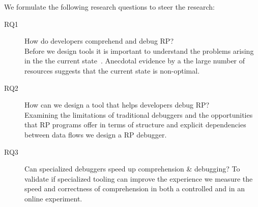 
We formulate the following research questions to steer the research: 

\begin{description}
\item[RQ1] How do developers comprehend and debug RP? \\
Before we design tools it is important to understand the problems arising in the the current state~\cite{singer2010examination}. Anecdotal evidence by a the large number of resources 
 suggests that the current state is non-optimal.

%

\item[RQ2] How can we design a tool that helps developers debug RP? \\
Examining the limitations of traditional debuggers and the opportunities that RP programs offer in terms of structure and explicit dependencies between data flows we design a RP debugger.


\item[RQ3] Can specialized debuggers speed up comprehension \& debugging?
To validate if specialized tooling can improve the experience we measure the speed and correctness of comprehension in both a controlled and in an online experiment.

\end{description}
